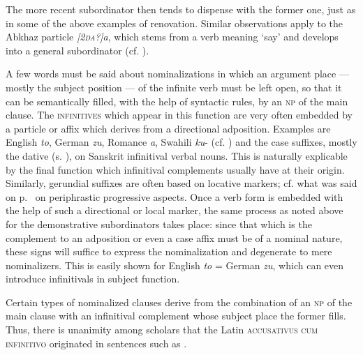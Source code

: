 \noindent The more recent subordinator then tends to dispense with the former one, just as in some of the above examples of renovation. Similar observations apply to the Abkhaz particle \textit{[2\textsc{da}?]a}, which stems from a verb meaning ‘say’ and develops into a general subordinator (cf. \citealt[5--8, 28--35, 43]{Hewitt1979}).

A few words must be said about nominalizations in which an argument place — mostly the subject position — of the infinite verb must be left open, so that it can be semantically filled, with the help of syntactic rules, by an \textsc{np} of the main clause. The \textsc{infinitives} which appear in this function are very often embedded by a particle or affix which derives from a directional adposition. Examples are English \textit{to}, German \textit{zu}, Romance \textit{a}, Swahili \textit{ku}{}- (cf. \citealt{Meinhof1936}) and the case suffixes, mostly the dative (s. \citealt[298]{Szemerényi1970}), on Sanskrit infinitival verbal nouns. This is naturally explicable by the final function which infinitival complements usually have at their origin. Similarly, gerundial suffixes are often based on locative markers; cf. what was said on p.~\pageref{page33}\chk%
on periphrastic progressive aspects. Once a verb form is embedded with the help of such a directional or local marker, the same process as noted above for the demonstrative subordinators takes place: since that which is the complement to an adposition or even a case affix must be of a nominal nature, these signs will suffice to express the nominalization and degenerate to mere nominalizers. This is easily shown for English \textit{to} = German \textit{zu}, which can even introduce infinitivals in subject function.

Certain types of nominalized clauses derive from the combination of an \textsc{np} of the main clause with an infinitival complement whose subject place the former fills. Thus, there is unanimity among scholars that the Latin \textsc{accusativus cum infinitivo} originated in sentences such as .

